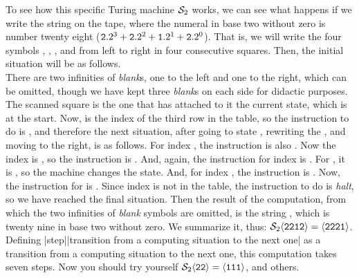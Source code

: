 To see how this specific Turing machine ${\cal S}_2$ works,
we can see what happens if we write the string  on the tape,
where the numeral  in base two without zero
is number twenty eight ($\hbox{\tt2}.2^3+\hbox{\tt2}.2^2+\hbox{\tt1}.2^1+\hbox{\tt2}.2^0$).
That is, we will write the four symbols , , , and 
from left to right in four consecutive squares.
Then, the initial situation will be as follows.
\\
There are two infinities of {\em blank}s,
one to the left and one to the right, which can be omitted,
though we have kept three {\em blank}s
on each side for didactic purposes.
The scanned square is the one that has attached to it
the current state, which is  at the start.
Now,  is the index of the third row in the table,
so the instruction to do is ,
and therefore the next situation,
after going to state , rewriting the , and moving to the right,
is as follows.
\qquad
For index , the instruction is also .
\qquad
Now the index is , so the instruction is .
\qquad
And, again, the instruction for index  is .
\qquad
For , it is ,
so the machine changes the state.
\qquad
And, for index , the instruction is .
\qquad
Now, the instruction for  is .
\qquad\dest
Since index  is not in the table,
the instruction to do is {\em halt}, so
we have reached the final situation.
Then the result of the computation,
from which the two infinities of {\em blank} symbols are omitted,
is the string , which is twenty nine in base two without zero.
We summarize it, thus:
$\RS S_{\rm 2}<2212> = \RS<2221>$.
Defining |step||transition from a computing situation
 to the next one|
 as a transition from a computing situation to the next one,
this computation takes seven steps.
Now you should try yourself
$\RS S_{\rm 2}<22> = \RS<111>$,
and others.

\vfil\break

